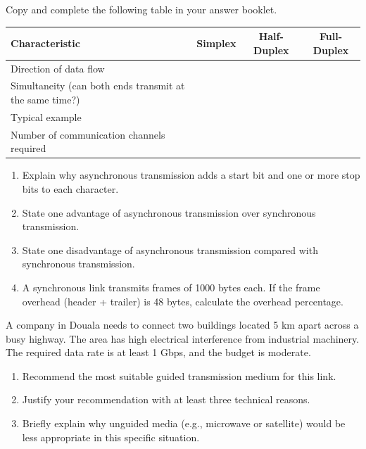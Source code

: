 \documentclass[11pt]{article}
\newcounter{popsec}
\newcounter{popsub}
\newcommand{\courssub}[1]{%
  \stepcounter{popsub}%
  \par\vspace{9pt}\noindent{\popxbold\fontsize{11.5}{13}\selectfont\color{popink}{\color{poporange}\thepopsec.\thepopsub}\hspace{6pt}#1}\par\nopagebreak\vspace{4pt}
}
\begin{document}
\courssub{I practise}

\begin{exercice}
Copy and complete the following table in your answer booklet.

\begin{center}
\begin{tabular}{|l|c|c|c|}
\hline
\textbf{Characteristic} & \textbf{Simplex} & \textbf{Half-Duplex} & \textbf{Full-Duplex} \\ \hline
Direction of data flow & & & \\ \hline
Simultaneity (can both ends transmit at the same time?) & & & \\ \hline
Typical example & & & \\ \hline
Number of communication channels required & & & \\ \hline
\end{tabular}
\end{center}
\end{exercice}

\begin{exercice}
\begin{enumerate}
\item Explain why asynchronous transmission adds a start bit and one or more stop bits to each character.
\item State one advantage of asynchronous transmission over synchronous transmission.
\item State one disadvantage of asynchronous transmission compared with synchronous transmission.
\item A synchronous link transmits frames of 1000 bytes each. If the frame overhead (header + trailer) is 48 bytes, calculate the overhead percentage.
\end{enumerate}
\end{exercice}

\begin{exercice}
A company in Douala needs to connect two buildings located 5 km apart across a busy highway. The area has high electrical interference from industrial machinery. The required data rate is at least 1 Gbps, and the budget is moderate.

\begin{enumerate}
\item Recommend the most suitable guided transmission medium for this link.
\item Justify your recommendation with at least three technical reasons.
\item Briefly explain why unguided media (e.g., microwave or satellite) would be less appropriate in this specific situation.
\end{enumerate}
\end{exercice}
\end{document}
